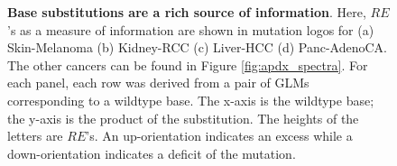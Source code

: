 \begin{figure}[ht!]
    \caption{\textbf{Base substitutions are a rich source of information}. Here, $RE$'s as a measure of information are shown in mutation logos for (a) Skin-Melanoma (b) Kidney-RCC (c) Liver-HCC (d) Panc-AdenoCA. The other cancers can be found in Figure \ref{fig:apdx_spectra}. For each panel, each row was derived from a pair of GLMs corresponding to a wildtype base. The x-axis is the wildtype base; the y-axis is the product of the substitution. The heights of the letters are $RE$'s. An up-orientation indicates an excess while a down-orientation indicates a deficit of the mutation.}
    \label{fig:spectra}
\end{figure}